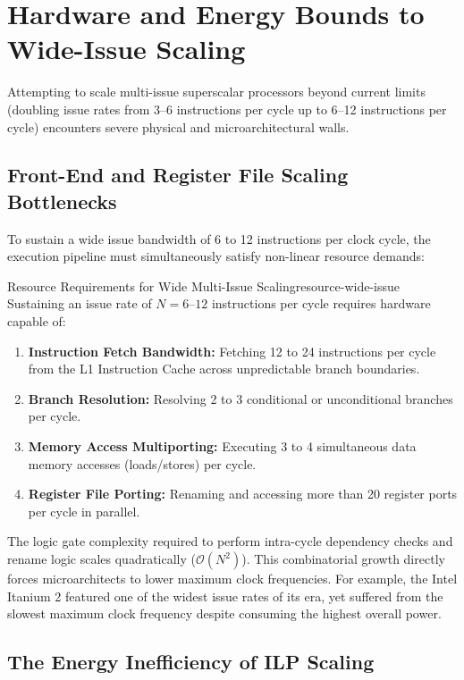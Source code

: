 \section{Hardware and Energy Bounds to Wide-Issue Scaling}
\label{sec:hardware_energy_bounds_ilp}

Attempting to scale multi-issue superscalar processors beyond current limits (doubling issue rates from 3–6 instructions per cycle up to 6–12 instructions per cycle) encounters severe physical and microarchitectural walls.

\subsection{Front-End and Register File Scaling Bottlenecks}

To sustain a wide issue bandwidth of 6 to 12 instructions per clock cycle, the execution pipeline must simultaneously satisfy non-linear resource demands:

\begin{concept}{Resource Requirements for Wide Multi-Issue Scaling}{resource-wide-issue}
Sustaining an issue rate of $N = 6\text{--}12$ instructions per cycle requires hardware capable of:
\begin{enumerate}
    \item \textbf{Instruction Fetch Bandwidth:} Fetching 12 to 24 instructions per cycle from the L1 Instruction Cache across unpredictable branch boundaries.
    \item \textbf{Branch Resolution:} Resolving 2 to 3 conditional or unconditional branches per cycle.
    \item \textbf{Memory Access Multiporting:} Executing 3 to 4 simultaneous data memory accesses (loads/stores) per cycle.
    \item \textbf{Register File Porting:} Renaming and accessing more than 20 register ports per cycle in parallel.
\end{enumerate}
\end{concept}

The logic gate complexity required to perform intra-cycle dependency checks and rename logic scales quadratically ($\mathcal{O}(N^2)$). This combinatorial growth directly forces microarchitects to lower maximum clock frequencies. For example, the Intel Itanium 2 featured one of the widest issue rates of its era, yet suffered from the slowest maximum clock frequency despite consuming the highest overall power.

\subsection{The Energy Inefficiency of ILP Scaling}

